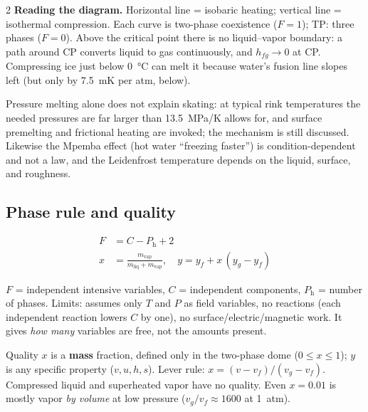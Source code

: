 \begin{multicols}{2}
\textbf{Reading the diagram.} Horizontal line = isobaric heating; vertical line = isothermal compression. Each curve is two-phase coexistence ($F=1$); TP: three phases ($F=0$). Above the critical point there is no liquid--vapor boundary: a path around CP converts liquid to gas continuously, and $h_{fg}\to0$ at CP. Compressing ice just below \SI{0}{\celsius} can melt it because water's fusion line slopes left (but only by \SI{7.5}{mK} per atm, below).

\begin{trapbox}Pressure melting alone does not explain skating: at typical rink temperatures the needed pressures are far larger than \SI{13.5}{MPa/K} allows for, and surface premelting and frictional heating are invoked; the mechanism is still discussed. Likewise the Mpemba effect (hot water ``freezing faster'') is condition-dependent and not a law, and the Leidenfrost temperature depends on the liquid, surface, and roughness.\end{trapbox}

\subsection{Phase rule and quality}\label{sec:phaserule}
\CORE{}
\begin{formulabox}
\vspace{-6pt}
\begin{align}
F &= C - P_{\text{h}} + 2 \label{F:phase:rule}\\
x &= \frac{m_{\text{vap}}}{m_{\text{liq}}+m_{\text{vap}}},\quad y = y_f + x\,(y_g-y_f) \label{F:phase:quality}
\end{align}
\end{formulabox}
$F$ = independent intensive variables, $C$ = independent components, $P_{\text{h}}$ = number of phases. Limits: assumes only $T$ and $P$ as field variables, no reactions (each independent reaction lowers $C$ by one), no surface/electric/magnetic work. It gives \emph{how many} variables are free, not the amounts present.

Quality $x$ is a \textbf{mass} fraction, defined only in the two-phase dome ($0\le x\le1$); $y$ is any specific property ($v,u,h,s$). Lever rule: $x=(v-v_f)/(v_g-v_f)$. Compressed liquid and superheated vapor have no quality. Even $x=0.01$ is mostly vapor \emph{by volume} at low pressure ($v_g/v_f\approx\num{1600}$ at 1~atm).


\end{multicols}
